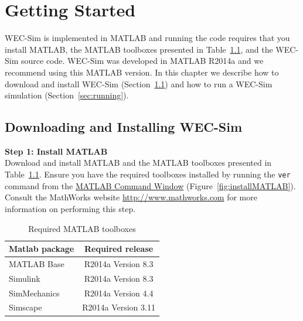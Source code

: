 \chapter{Getting Started}
WEC-Sim is implemented in MATLAB \cite{matlab2014} and running the code requires that you install MATLAB, the MATLAB toolboxes presented in Table~\ref{tab:requiredSoftware}, and the WEC-Sim source code. WEC-Sim was developed in MATLAB R2014a and we recommend using this MATLAB version. In this chapter we describe how to download and install WEC-Sim (Section~\ref{sec:instillation}) and how to run a WEC-Sim simulation (Section~\ref{sec:running}).

\section{Downloading and Installing WEC-Sim} \label{sec:instillation}

\textbf{Step 1: Install MATLAB}\\
Download and install MATLAB and the MATLAB toolboxes presented in Table~\ref{tab:requiredSoftware}. Ensure you have the required toolboxes installed by running the \texttt{ver} command from the \href{http://www.mathworks.com/help/matlab/matlab_env/enter-statements-in-command-window.html}{MATLAB Command Window} (Figure~\ref{fig:installMATLAB}). Consult the MathWorks website \href{http://www.mathworks.com}{http://www.mathworks.com} for more information on performing this step.\\

\begin{table}
\begin{center}
\protect\caption{Required MATLAB toolboxes}\label{fig:installMATLAB}
\begin{tabular}{| l | c |}
\hline
 	\textbf{Matlab package}&\textbf{Required release} \\
\hline
	MATLAB Base&R2014a Version 8.3 \\
\hline
	Simulink&R2014a Version 8.3 \\
\hline
	SimMechanics&R2014a Version 4.4 \\
\hline
	Simscape&R2014a Version 3.11 \\
\hline
\end{tabular}
\label{tab:requiredSoftware}
\end{center}
\end{table}

